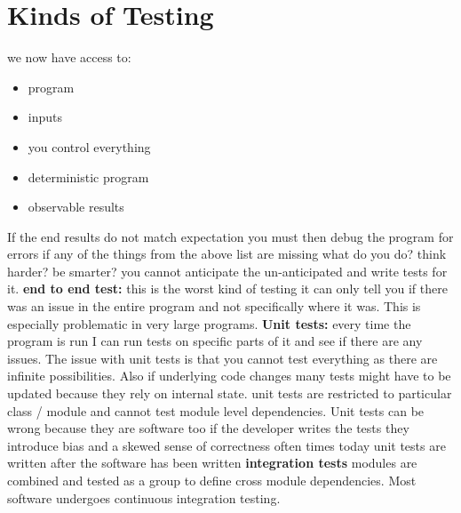 \documentclass[twoside]{article}
\begin{document}
\section{Kinds of Testing}
we now have access to:
\begin{itemize}
    \item program
    \item inputs
    \item you control everything
    \item deterministic program
    \item observable results
\end{itemize}
If the end results do not match expectation you must then debug the program for errors
\newline
if any of the things from the above list are missing what do you do? think harder? be smarter? you cannot anticipate the un-anticipated and write tests for it.
\newline
\textbf{end to end test:} this is the worst kind of testing it can only tell you if there was an issue in the entire program and not specifically where it was. This is especially problematic in very large programs.
\newline
\textbf{Unit tests:} every time the program is run I can run tests on specific parts of it and see if there are any issues. 
\newline
The issue with unit tests is that you cannot test everything as there are infinite possibilities. Also if underlying code changes many tests might have to be updated because they rely on internal state. 
\newline
unit tests are restricted to particular class / module and cannot test module level dependencies.
\newline
Unit tests can be wrong because they are software too
\newline
if the developer writes the tests they introduce bias and a skewed sense of correctness
\newline
often times today unit tests are written after the software has been written
\newline
\textbf{integration tests} modules are combined and tested as a group to define cross module dependencies. Most software undergoes continuous integration testing.
\end{document}
